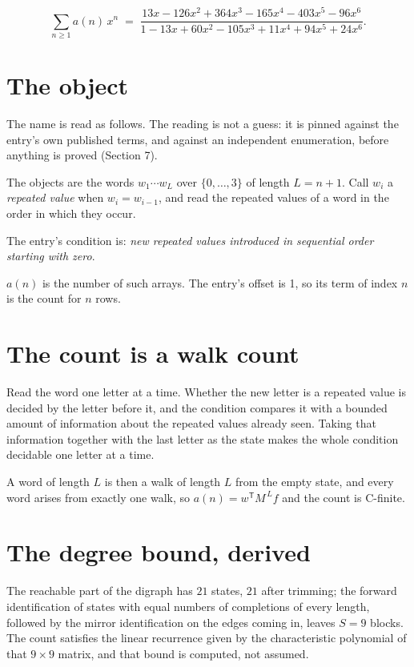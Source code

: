 \documentclass[11pt]{article}
\theoremstyle{definition}
\begin{document}
\[\sum_{n \ge 1} a(n)\,x^n \;=\; \frac{13x - 126x^{2} + 364x^{3} - 165x^{4} - 403x^{5} - 96x^{6}}{1 - 13x + 60x^{2} - 105x^{3} + 11x^{4} + 94x^{5} + 24x^{6}}.\]

\section{The object}

The name is read as follows. The reading is not a guess: it is pinned against the entry's own published terms, and against an independent enumeration, before anything is proved (Section 7).

The objects are the words $w_1\cdots w_L$ over $\{0,\dots,3\}$ of length $L = n + 1$. Call $w_i$ a {\itshape repeated value} when $w_i = w_{i-1}$, and read the repeated values of a word in the order in which they occur.

The entry's condition is: {\itshape new repeated values introduced in sequential order starting with zero}.

$a(n)$ is the number of such arrays. The entry's offset is 1, so its term of index $n$ is the count for $n$ rows.

\section{The count is a walk count}

Read the word one letter at a time. Whether the new letter is a repeated value is decided by the letter before it, and the condition compares it with a bounded amount of information about the repeated values already seen. Taking that information together with the last letter as the state makes the whole condition decidable one letter at a time.

A word of length $L$ is then a walk of length $L$ from the empty state, and every word arises from exactly one walk, so $a(n) = w^{\mathsf T}M^{\,L}f$ and the count is C-finite.

\section{The degree bound, derived}

The reachable part of the digraph has $21$ states, $21$ after trimming; the forward identification of states with equal numbers of completions of every length, followed by the mirror identification on the edges coming in, leaves $S = 9$ blocks. The count satisfies the linear recurrence given by the characteristic polynomial of that $9\times9$ matrix, and that bound is computed, not assumed.
\end{document}
